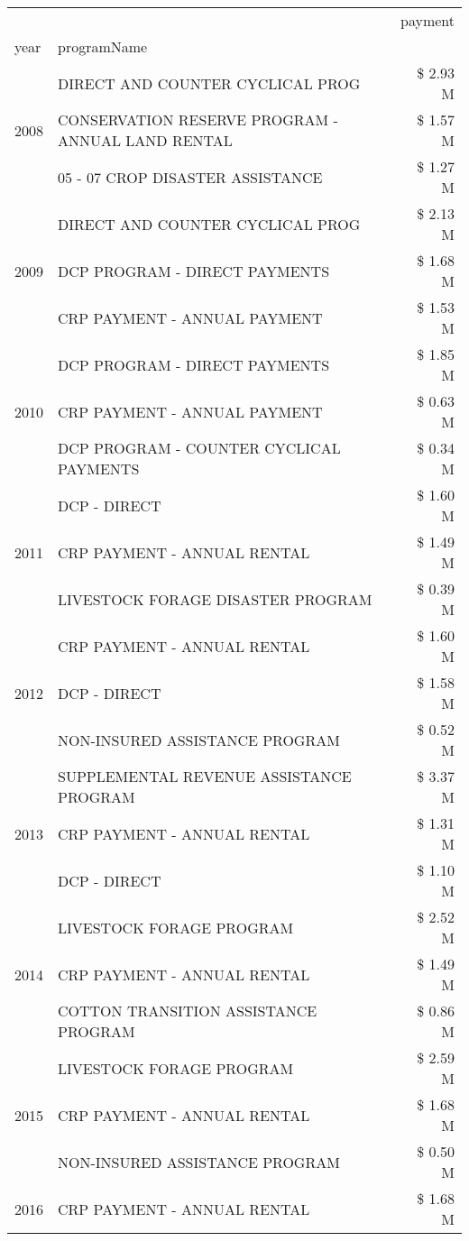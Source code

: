 \begin{tabular}{llr}
\toprule
 &  & payment \\
year & programName &  \\
\midrule
\multirow[t]{3}{*}{2008} & DIRECT AND COUNTER CYCLICAL PROG & \$ 2.93 M \\
 & CONSERVATION RESERVE PROGRAM - ANNUAL LAND RENTAL & \$ 1.57 M \\
 & 05 - 07 CROP DISASTER ASSISTANCE & \$ 1.27 M \\
\cline{1-3}
\multirow[t]{3}{*}{2009} & DIRECT AND COUNTER CYCLICAL PROG & \$ 2.13 M \\
 & DCP PROGRAM - DIRECT PAYMENTS & \$ 1.68 M \\
 & CRP PAYMENT - ANNUAL PAYMENT & \$ 1.53 M \\
\cline{1-3}
\multirow[t]{3}{*}{2010} & DCP PROGRAM - DIRECT PAYMENTS & \$ 1.85 M \\
 & CRP PAYMENT - ANNUAL PAYMENT & \$ 0.63 M \\
 & DCP PROGRAM - COUNTER CYCLICAL PAYMENTS & \$ 0.34 M \\
\cline{1-3}
\multirow[t]{3}{*}{2011} & DCP - DIRECT & \$ 1.60 M \\
 & CRP PAYMENT - ANNUAL RENTAL & \$ 1.49 M \\
 & LIVESTOCK FORAGE DISASTER PROGRAM & \$ 0.39 M \\
\cline{1-3}
\multirow[t]{3}{*}{2012} & CRP PAYMENT - ANNUAL RENTAL & \$ 1.60 M \\
 & DCP - DIRECT & \$ 1.58 M \\
 & NON-INSURED ASSISTANCE PROGRAM & \$ 0.52 M \\
\cline{1-3}
\multirow[t]{3}{*}{2013} & SUPPLEMENTAL REVENUE ASSISTANCE PROGRAM & \$ 3.37 M \\
 & CRP PAYMENT - ANNUAL RENTAL & \$ 1.31 M \\
 & DCP - DIRECT & \$ 1.10 M \\
\cline{1-3}
\multirow[t]{3}{*}{2014} & LIVESTOCK FORAGE PROGRAM & \$ 2.52 M \\
 & CRP PAYMENT - ANNUAL RENTAL & \$ 1.49 M \\
 & COTTON TRANSITION ASSISTANCE PROGRAM & \$ 0.86 M \\
\cline{1-3}
\multirow[t]{3}{*}{2015} & LIVESTOCK FORAGE PROGRAM & \$ 2.59 M \\
 & CRP PAYMENT - ANNUAL RENTAL & \$ 1.68 M \\
 & NON-INSURED ASSISTANCE PROGRAM & \$ 0.50 M \\
\cline{1-3}
\multirow[t]{3}{*}{2016} & CRP PAYMENT - ANNUAL RENTAL & \$ 1.68 M \\

\end{tabular}
